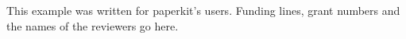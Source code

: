 This example was written for paperkit's users. Funding lines, grant numbers
and the names of the reviewers go here.
